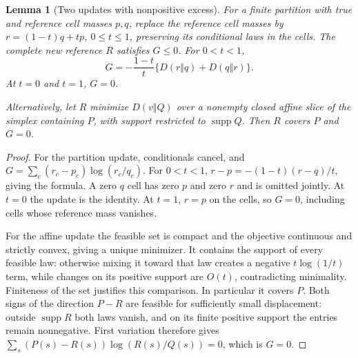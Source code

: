 \documentclass[11pt]{article}
\newtheorem{lemma}{Lemma}
\begin{document}
\begin{lemma}[Two updates with nonpositive excess]\label{lem:v12-update}
For a finite partition with true and reference cell masses $p,q$, replace the reference
cell masses by $r=(1-t)q+tp$, $0\leq t\leq1$, preserving its conditional laws in the cells.
The complete new reference $R$ satisfies $G\leq0$. For $0<t<1$,
\[
 G=-\frac{1-t}{t}\{D(r\Vert q)+D(q\Vert r)\}.
\]
At $t=0$ and $t=1$, $G=0$.

Alternatively, let $R$ minimize $D(v\Vert Q)$ over a nonempty closed affine slice of
the simplex containing $P$, with support restricted to $\operatorname{supp}Q$.
Then $R$ covers $P$ and $G=0$.
\end{lemma}
\begin{proof}
For the partition update, conditionals cancel, and
$G=\sum_c(r_c-p_c)\log(r_c/q_c)$.
For $0<t<1$, $r-p=-(1-t)(r-q)/t$, giving the formula. A zero $q$ cell has zero
$p$ and zero $r$ and is omitted jointly. At $t=0$ the update is the identity.
At $t=1$, $r=p$ on the cells, so $G=0$, including cells whose reference mass vanishes.

For the affine update the feasible set is compact and the objective continuous and
strictly convex, giving a unique minimizer. It contains the support of every feasible
law: otherwise mixing it toward that law creates a negative $t\log(1/t)$ term, while
changes on its positive support are $O(t)$, contradicting minimality. Finiteness of the
set justifies this comparison. In particular it covers $P$.
Both signs of the direction $P-R$ are feasible for sufficiently small displacement:
outside $\operatorname{supp}R$ both laws vanish, and on its finite positive support the
entries remain nonnegative. First variation therefore gives
$\sum_s(P(s)-R(s))\log(R(s)/Q(s))=0$, which is $G=0$.
\end{proof}
\end{document}
